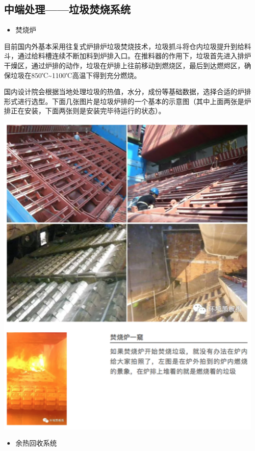 \documentclass[]{book}
\providecommand{\tightlist}{%
  \setlength{\itemsep}{0pt}\setlength{\parskip}{0pt}}
\begin{document}
\subsection{中端处理------垃圾焚烧系统}

\begin{itemize}
\tightlist
\item
  焚烧炉
\end{itemize}

目前国内外基本采用往复式炉排炉垃圾焚烧技术，垃圾抓斗将仓内垃圾提升到给料斗，通过给料槽连续不断加料到炉排入口。在推料器的作用下，垃圾首先进入排炉干燥区，通过炉排的动作，垃圾在炉排上往前移动到燃烧区，最后到达燃烬区，确保垃圾在850℃\textasciitilde{}1100℃高温下得到充分燃烧。

国内设计院会根据当地处理垃圾的热值，水分，成份等基础数据，选择合适的炉排形式进行选型。下面几张图片是垃圾炉排的一个基本的示意图（其中上面两张是炉排正在安装，下面两张则是安装完毕待运行的状态）。

\includegraphics[width=6.72in]{images/ljfs4}

\begin{itemize}
\tightlist
\item
  余热回收系统
\end{itemize}
\end{document}
